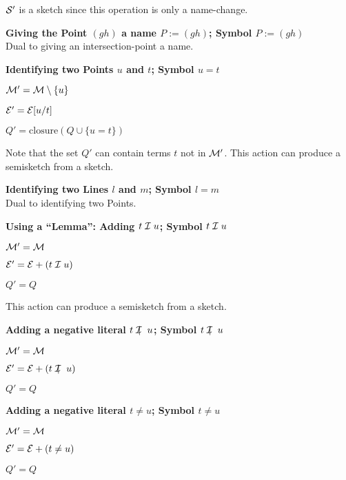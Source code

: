 \begin{description}
        $\cS'$ is a sketch since this operation is only a
        name-change. 
\item\textbf{Giving the Point $(gh)$ a name $P:=(gh)$; Symbol
        $P:=(gh)$}\\
        Dual to giving an intersection-point a name.
\item\textbf{Identifying two Points $u$ and $t$; Symbol $u=t$}
        \begin{compactitem}
        \item $\cM'=\cM\setminus\{u\}$
        \item $\cE'=\cE[u/t]$
        \item $Q'=\text{closure}(Q\cup\{u=t\})$
        \end{compactitem}
        Note that the set $Q'$ can contain terms $t$ not in $\cM'$.
        This action can produce a semisketch from a sketch.
\item\textbf{Identifying two Lines $l$ and $m$; Symbol $l=m$}\\
        Dual to identifying two Points.
\item\textbf{Using a ``Lemma'': Adding $t\cI u$; Symbol $t\cI u$}
        \begin{compactitem}
        \item $\cM'=\cM$
        \item $\cE'=\cE+(t\cI u)$
        \item $Q'=Q$
        \end{compactitem}
        This action can produce a semisketch from a sketch. 
\item\textbf{Adding a negative literal $t\notcI u$; Symbol $t\notcI u$}
        \begin{compactitem}
        \item $\cM'=\cM$
        \item $\cE'=\cE+(t\notcI u)$
        \item $Q'=Q$
        \end{compactitem}
\item\textbf{Adding a negative literal $t\not=u$; Symbol $t\not=u$}
        \begin{compactitem}
        \item $\cM'=\cM$
        \item $\cE'=\cE+(t\not=u)$
        \item $Q'=Q$
        \end{compactitem}
\end{description}

